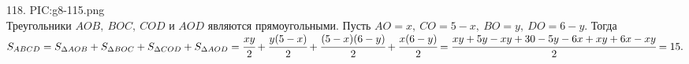 118. {{PIC:g8-115.png}}\\
Треугольники $AOB,\ BOC,\ COD$ и $AOD$ являются прямоугольными. Пусть $AO=x,\ CO=5-x,\ BO=y,\ DO=6-y.$ Тогда $S_{ABCD}=S_{\Delta AOB}+S_{\Delta BOC}+S_{\Delta COD}+S_{\Delta AOD}=\cfrac{xy}{2}+\cfrac{y(5-x)}{2}+\cfrac{(5-x)(6-y)}{2}+\cfrac{x(6-y)}{2}=\cfrac{xy+5y-xy+30-5y-6x+xy+6x-xy}{2}=15.$\\
